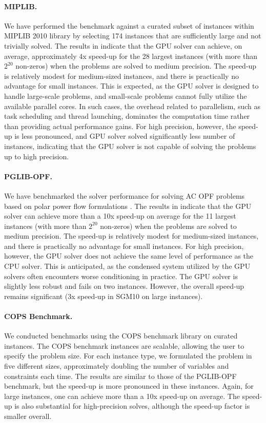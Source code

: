 \documentclass{article}
\begin{document}
\paragraph{MIPLIB.}
We have performed the benchmark against a curated subset of instances within MIPLIB 2010 library by selecting 174 instances that are sufficiently large and not trivially solved. The results in  indicate that the GPU solver can achieve, on average, approximately 4x speed-up for the 28 largest instances (with more than $2^{20}$ non-zeros) when the problems are solved to medium precision. The speed-up is relatively modest for medium-sized instances, and there is practically no advantage for small instances. This is expected, as the GPU solver is designed to handle large-scale problems, and small-scale problems cannot fully utilize the available parallel cores. In such cases, the overhead related to parallelism, such as task scheduling and thread launching, dominates the computation time rather than providing actual performance gains. For high precision, however, the speed-up is less pronounced, and GPU solver solved significantly less number of instances, indicating that the GPU solver is not capable of solving the problems up to high precision.


\paragraph{PGLIB-OPF.}
We have benchmarked the solver performance for solving AC OPF problems based on polar power flow formulations \cite{PowerModelsJLOpenSource}. The results in  indicate that the GPU solver can achieve more than a 10x speed-up on average for the 11 largest instances (with more than $2^{20}$ non-zeros) when the problems are solved to medium precision. The speed-up is relatively modest for medium-sized instances, and there is practically no advantage for small instances. For high precision, however, the GPU solver does not achieve the same level of performance as the CPU solver. This is anticipated, as the condensed system utilized by the GPU solvers often encounters worse conditioning in practice.
The GPU solver is slightly less robust and fails on two instances. However, the overall speed-up remains significant (3x speed-up in SGM10 on large instances).

\paragraph{COPS Benchmark.}
We conducted benchmarks using the COPS benchmark library on curated instances. The COPS benchmark instances are scalable, allowing the user to specify the problem size. For each instance type, we formulated the problem in five different sizes, approximately doubling the number of variables and constraints each time.
The results are similar to those of the PGLIB-OPF benchmark, but the speed-up is more pronounced in these instances.
Again, for large instances, one can achieve more than a 10x speed-up on average. The speed-up is also substantial for high-precision solves, although the speed-up factor is smaller overall.
\end{document}
